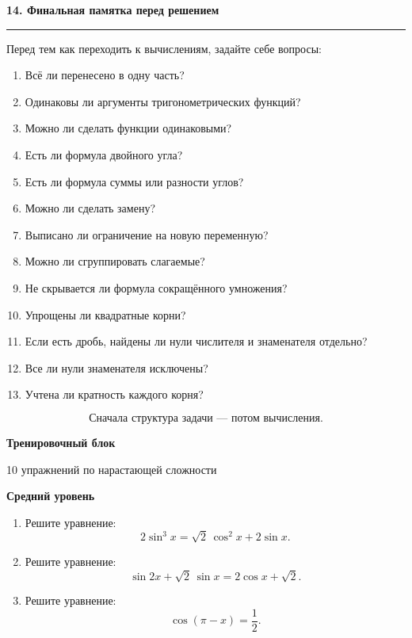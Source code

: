 \documentclass[a4paper,12pt]{article}
\newcommand{\checktitle}[1]{%
    \vspace{0.4em}
    {\Large\bfseries\textcolor{darkaccent}{#1}}\par
    \vspace{0.25em}
    {\color{accent!55}\rule{\linewidth}{0.6pt}}
    \vspace{0.45em}
}
\newcommand{\subcheck}[1]{%
    \vspace{0.25em}
    {\large\bfseries\textcolor{accent}{#1}}\par
    \vspace{0.15em}
}
\begin{document}
\checktitle{14. Финальная памятка перед решением}

Перед тем как переходить к вычислениям, задайте себе вопросы:

\begin{enumerate}
    \item Всё ли перенесено в одну часть?
    \item Одинаковы ли аргументы тригонометрических функций?
    \item Можно ли сделать функции одинаковыми?
    \item Есть ли формула двойного угла?
    \item Есть ли формула суммы или разности углов?
    \item Можно ли сделать замену?
    \item Выписано ли ограничение на новую переменную?
    \item Можно ли сгруппировать слагаемые?
    \item Не скрывается ли формула сокращённого умножения?
    \item Упрощены ли квадратные корни?
    \item Если есть дробь, найдены ли нули числителя и знаменателя отдельно?
    \item Все ли нули знаменателя исключены?
    \item Учтена ли кратность каждого корня?
\end{enumerate}

\[
\boxed{
\text{Сначала структура задачи --- потом вычисления.}
}
\]

\newpage

\thispagestyle{fancy}

\begin{center}
    {\LARGE\bfseries\textcolor{darkaccent}{Тренировочный блок}}
    
    \vspace{0.2cm}
    
    {\large 10 упражнений по нарастающей сложности}
\end{center}

\vspace{0.5cm}

\subcheck{Средний уровень}

\begin{enumerate}[label=\textbf{\arabic*.}]

\item Решите уравнение:
\[
    2\sin^3x
    =
    \sqrt2\,\cos^2x+2\sin x.
\]

\item Решите уравнение:
\[
    \sin2x+\sqrt2\,\sin x
    =
    2\cos x+\sqrt2.
\]

\item Решите уравнение:
\[
    \cos(\pi-x)=\frac12.
\]

\end{enumerate}
\end{document}

